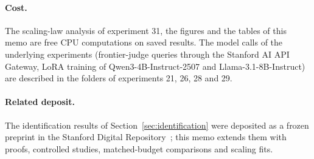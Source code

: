 \paragraph{Cost.}
The scaling-law analysis of experiment 31, the figures and the tables of this memo are free CPU computations on saved results.
The model calls of the underlying experiments (frontier-judge queries through the Stanford AI API Gateway, LoRA training of Qwen3-4B-Instruct-2507 and Llama-3.1-8B-Instruct) are described in the folders of experiments 21, 26, 28 and 29.

\paragraph{Related deposit.}
The identification results of Section~\ref{sec:identification} were deposited as a frozen preprint in the Stanford Digital Repository~\citep{miranda2026correlation}; this memo extends them with proofs, controlled studies, matched-budget comparisons and scaling fits.
